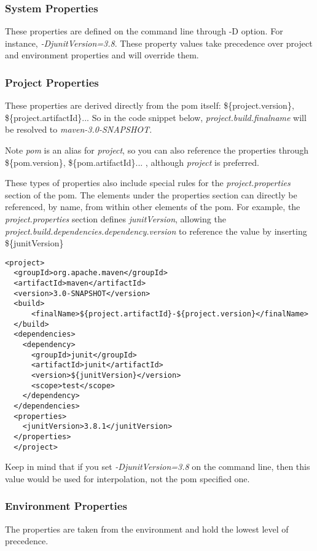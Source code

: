 \documentclass[12pt]{amsart}
\begin{document}
\subsubsection{System Properties}
These properties are defined on the command line through -D option. For instance, \emph{-DjunitVersion=3.8}. These property values take precedence over project and environment properties and will override them.

\subsubsection{Project Properties}  These properties are derived directly from the pom itself: \$\{project.version\}, \$\{project.artifactId\}... So in the code snippet below, \emph{project.build.finalname} will be resolved to\emph{ maven-3.0-SNAPSHOT}. 

Note \emph{pom} is an alias for\emph{ project}, so you can also reference the properties through \$\{pom.version\}, \$\{pom.artifactId\}... , although \emph{project} is preferred.

These types of properties also include special rules for the \emph{project.properties }section of the pom. The elements under the properties section can directly be referenced, by name, from within other elements of the pom. For example, the \emph{project.properties }section defines \emph{junitVersion}, allowing the 
\emph{ project.build.dependencies.dependency.version} to reference the value by inserting \$\{junitVersion\}

\begin{verbatim}
<project>
  <groupId>org.apache.maven</groupId>
  <artifactId>maven</artifactId>
  <version>3.0-SNAPSHOT</version>
  <build>
      <finalName>${project.artifactId}-${project.version}</finalName>
  </build>
  <dependencies>
    <dependency>
      <groupId>junit</groupId>
      <artifactId>junit</artifactId>
      <version>${junitVersion}</version>
      <scope>test</scope>
    </dependency>
  </dependencies>
  <properties>
    <junitVersion>3.8.1</junitVersion>
  </properties>
  </project>
\end{verbatim}

Keep in mind that if you set  \emph{-DjunitVersion=3.8} on the command line, then this value would be used for interpolation, not the pom specified one.

\subsubsection{Environment Properties}
The properties are taken from the environment and hold the lowest level of precedence.
\end{document}
